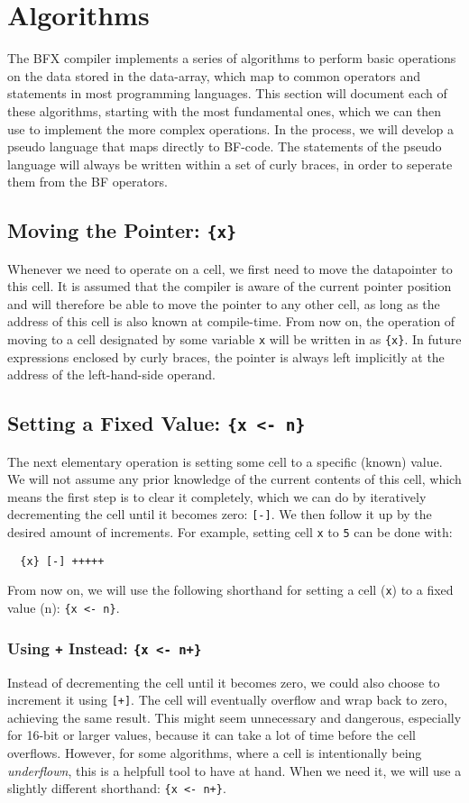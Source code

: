 \section{Algorithms}
The BFX compiler implements a series of algorithms to perform basic operations on the data stored in the data-array, which map to common operators and statements in most programming languages. This section will document each of these algorithms, starting with the most fundamental ones, which we can then use to implement the more complex operations. In the process, we will develop a pseudo language that maps directly to BF-code. The statements of the pseudo language will always be written within a set of curly braces, in order to seperate them from the BF operators.

\subsection{Moving the Pointer: \texttt{\{x\}}}
Whenever we need to operate on a cell, we first need to move the datapointer to this cell. It is assumed that the compiler is aware of the current pointer position and will therefore be able to move the pointer to any other cell, as long as the address of this cell is also known at compile-time. From now on, the operation of moving to a cell designated by some variable \texttt{x} will be written in as \texttt{\{x\}}. In future expressions enclosed by curly braces, the pointer is always left implicitly at the address of the left-hand-side operand.

\subsection{Setting a Fixed Value: \texttt{\{x <- n\}}}
The next elementary operation is setting some cell to a specific (known) value. We will not assume any prior knowledge of the current contents of this cell, which means the first step is to clear it completely, which we can do by iteratively decrementing the cell until it becomes zero: \texttt{[-]}. We then follow it up by the desired amount of increments. For example, setting cell \texttt{x} to \texttt{5} can be done with:
\begin{lstlisting}
  {x} [-] +++++
\end{lstlisting}
From now on, we will use the following shorthand for setting a cell (\texttt{x}) to a fixed value (n): \texttt{\{x <- n\}}.
\subsubsection{Using \texttt{+} Instead: \texttt{\{x <- n+\}}}
Instead of decrementing the cell until it becomes zero, we could also choose to increment it using \texttt{[+]}. The cell will eventually overflow and wrap back to zero, achieving the same result. This might seem unnecessary and dangerous, especially for 16-bit or larger values, because it can take a lot of time before the cell overflows. However, for some algorithms, where a cell is intentionally being \emph{underflown}, this is a helpfull tool to have at hand. When we need it, we will use a slightly different shorthand: \texttt{\{x <- n+\}}.

